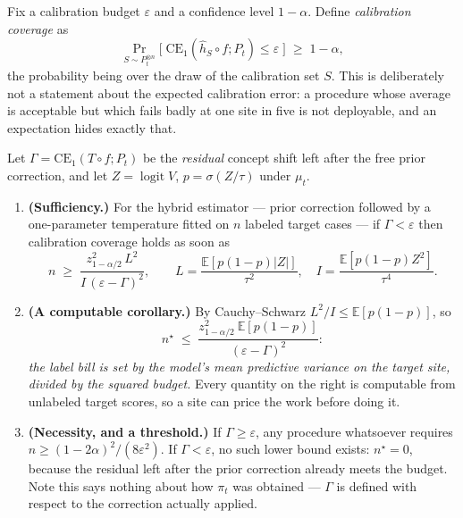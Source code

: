 Fix a calibration budget $\varepsilon$ and a confidence level $1-\alpha$.  Define
\emph{calibration coverage} as
\[
  \Pr_{S\sim P_t^{\otimes n}}\Big[\;\mathrm{CE}_1(\hat h_S\circ f;P_t)\le\varepsilon\;\Big]\;\ge\;1-\alpha ,
\]
the probability being over the draw of the calibration set $S$.  This is
deliberately not a statement about the expected calibration error: a procedure
whose average is acceptable but which fails badly at one site in five is not
deployable, and an expectation hides exactly that.

Let $\Gamma=\mathrm{CE}_1(T\circ f;P_t)$ be the \emph{residual} concept shift
left after the free prior correction, and let $Z=\operatorname{logit}V$,
$p=\sigma(Z/\tau)$ under $\mu_t$.

\begin{theorem}\label{thm:samplesize}
\begin{enumerate}[label=(\alph*)]
\item \textbf{(Sufficiency.)}  For the hybrid estimator --- prior correction
followed by a one-parameter temperature fitted on $n$ labeled target cases ---
if $\Gamma<\varepsilon$ then calibration coverage holds as soon as
\[
  n\;\ge\;\frac{z_{1-\alpha/2}^2\,L^2}{I\,(\varepsilon-\Gamma)^2},
  \qquad
  L=\frac{\mathbb{E}[p(1-p)|Z|]}{\tau^{2}},\quad
  I=\frac{\mathbb{E}[p(1-p)Z^{2}]}{\tau^{4}} .
\]
\item \textbf{(A computable corollary.)}  By Cauchy--Schwarz $L^2/I\le\mathbb{E}[p(1-p)]$, so
\[
  n^\star\;\le\;\frac{z_{1-\alpha/2}^2\ \mathbb{E}[p(1-p)]}{(\varepsilon-\Gamma)^2}:
\]
\emph{the label bill is set by the model's mean predictive variance on the
target site, divided by the squared budget.}  Every quantity on the right is
computable from unlabeled target scores, so a site can price the work before
doing it.
\item \textbf{(Necessity, and a threshold.)}  If $\Gamma\ge\varepsilon$, any
procedure whatsoever requires
$n\ge(1-2\alpha)^{2}/(8\varepsilon^{2})$.
If $\Gamma<\varepsilon$, no such lower bound exists: $n^\star=0$, because the
residual left after the prior correction already meets the budget.  Note this
says nothing about how $\pi_t$ was obtained --- $\Gamma$ is defined with respect
to the correction actually applied.
\end{enumerate}
\end{theorem}

